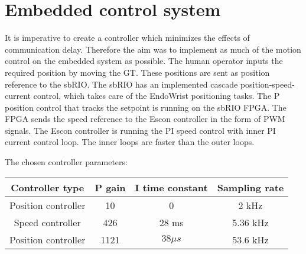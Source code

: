\section{Embedded control system}

It is imperative to create a controller which minimizes the effects of communication delay. Therefore the aim was to implement as much of the motion control on the embedded system as possible. The human operator  inputs the required position by moving the GT. These positions are sent as position reference to the sbRIO. 
The sbRIO has an implemented cascade position-speed-current control, which takes care of the EndoWrist positioning tasks. The P position control that tracks the setpoint is running on the sbRIO FPGA. The FPGA sends the speed reference to the Escon controller in the form of PWM signals. The Escon controller is running the PI speed control with inner PI current control loop. The inner loops are faster than the outer loops.

The chosen controller parameters:

\begin{center}
	\begin{tabular}{ c | c | c | c }
		\hline
		Controller type & P gain & I time constant & Sampling rate \\ \hline
		Position controller & 10 & 0 & 2 kHz \\ \hline
		Speed controller & 426 & 28 ms & 5.36 kHz \\ \hline
		Position controller & 1121 & $38 \mu s$ & 53.6 kHz \\ \hline
	\end{tabular}
\end{center}


